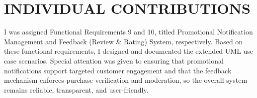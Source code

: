 \chapter{INDIVIDUAL CONTRIBUTIONS} \label{ch:data}
I was assigned Functional Requirements 9 and 10, titled Promotional Notification Management and Feedback (Review \& Rating) System, respectively. Based on these functional requirements, I designed and documented the extended UML use case scenarios. Special attention was given to ensuring that promotional notifications support targeted customer engagement and that the feedback mechanism enforces purchase verification and moderation, so the overall system remains reliable, transparent, and user-friendly.